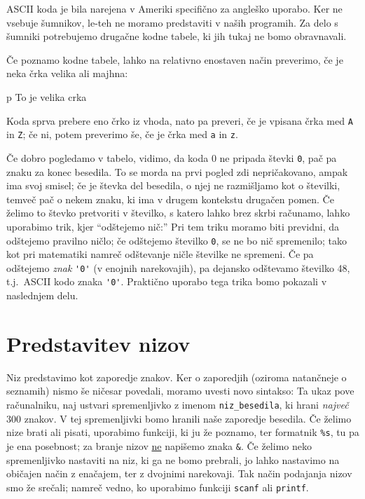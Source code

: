 \documentclass{book}
\begin{document}
\begin{errors}
  ASCII koda je bila narejena v Ameriki specifično za angleško uporabo.
  Ker ne vsebuje šumnikov, le-teh ne moramo predstaviti v naših programih.
  Za delo s šumniki potrebujemo drugačne kodne tabele, ki jih tukaj ne bomo
  obravnavali.
\end{errors}

\begin{examples}
  Če poznamo kodne tabele, lahko na relativno enostaven način preverimo, če je
  neka črka velika ali majhna:
  \begin{inout}
	p
	\tcblower
	To je velika crka
  \end{inout}
  Koda sprva prebere eno črko iz vhoda, nato pa preveri, če je vpisana črka med
  \verb+A+ in \verb+Z+; če ni, potem preverimo še, če je črka med \verb+a+ in
  \verb+z+.
\end{examples}

Če dobro pogledamo v tabelo, vidimo, da koda 0 ne pripada števki \verb+0+, pač
pa znaku za konec besedila.
To se morda na prvi pogled zdi nepričakovano, ampak ima svoj smisel; če je
števka del besedila, o njej ne razmišljamo kot o številki, temveč pač o nekem
znaku, ki ima v drugem kontekstu drugačen pomen.
Če želimo to števko pretvoriti v številko, s katero lahko brez skrbi računamo,
lahko uporabimo trik, kjer ``odštejemo nič:''
Pri tem triku moramo biti previdni, da odštejemo pravilno ničlo; če odštejemo
številko \verb+0+, se ne bo nič spremenilo; tako kot pri matematiki namreč
odštevanje ničle številke ne spremeni.
Če pa odštejemo \emph{znak} \verb+'0'+ (v enojnih narekovajih), pa dejansko
odštevamo številko 48, t.j.~ASCII kodo znaka \verb+'0'+.
Praktično uporabo tega trika bomo pokazali v naslednjem delu.

\section{Predstavitev nizov}

Niz predstavimo kot zaporedje znakov.
Ker o zaporedjih (oziroma natančneje o seznamih) nismo še ničesar povedali,
moramo uvesti novo sintakso:
Ta ukaz pove računalniku, naj ustvari spremenljivko z imenom
\verb+niz_besedila+, ki hrani \emph{največ} 300 znakov.
V tej spremenljivki bomo hranili naše zaporedje besedila.
Če želimo nize brati ali pisati, uporabimo funkciji, ki ju že poznamo, ter
formatnik \verb+%s+, tu pa je ena posebnost; za branje nizov \underline{ne}
napišemo znaka \verb+&+.
Če želimo neko spremenljivko nastaviti na niz, ki ga ne bomo prebrali, jo lahko
nastavimo na običajen način z enačajem, ter z dvojnimi narekovaji.
Tak način podajanja nizov smo že srečali; namreč vedno, ko uporabimo funkciji
\verb+scanf+ ali \verb+printf+.
\end{document}
